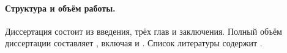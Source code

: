 \paragraph{Структура и объём работы.}
%
%
Диссертация состоит из введения, трёх глав и заключения.
Полный объём диссертации составляет , включая  и .
Список литературы содержит .
\fi
